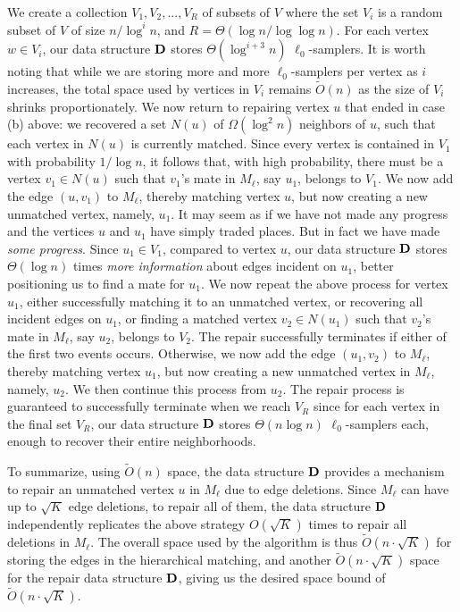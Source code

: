 \documentclass[11pt,a4paper]{article}
\newcommand{\D}{\mathsf{\bf D}}
\begin{document}
We create a collection $V_1, V_2, ..., V_R$ of subsets of $V$ where the set $V_i$ is a random subset of $V$ of size $n/\log^i n$, and $R = \Theta(\log n / \log \log n)$. For each vertex $w \in V_i$, our data structure $\D$ stores $\Theta(\log^{i+3} n)$ 
$\ell_0$-samplers. It is worth noting that while we are storing more and more $\ell_0$-samplers per vertex as $i$ increases, the total space used by vertices in $V_i$ remains $\tilde{O}(n)$ as the size of $V_i$ shrinks proportionately. 
We now return to repairing vertex $u$ that ended in case (b) above: we recovered a set $N(u)$ of $\Omega(\log^2 n)$ neighbors of $u$, such that each vertex in $N(u)$ is currently matched. Since every vertex is contained in $V_1$ with probability $1/\log n$, it follows that, with high probability, there must be a vertex $v_1 \in N(u)$ such that $v_1$'s mate in $M_{\ell}$, say $u_1$, belongs to $V_1$. We now add the edge $(u,v_1)$ to $M_{\ell}$, thereby matching vertex $u$, but now creating a new unmatched vertex, namely, $u_1$. It may seem as if we have not made any progress and the vertices $u$ and $u_1$ have simply traded places. But in fact we have made {\em some progress}. Since $u_1 \in V_1$, compared to vertex $u$, our data structure $\D$ stores $\Theta(\log n)$ times {\em more information} about edges incident on $u_1$, better positioning us to find a mate for $u_1$. We now repeat the above process for vertex $u_1$, either successfully matching it to an unmatched vertex, or recovering all incident edges on $u_1$, or finding a matched vertex $v_2 \in N(u_1)$ such that $v_2$'s mate in $M_{\ell }$, say $u_2$, belongs to $V_2$. The repair successfully terminates if either of the first two events occurs. Otherwise, we now add the edge $(u_1,v_2)$ to $M_{\ell}$, thereby matching vertex $u_1$, but now creating a new unmatched vertex in $M_{\ell }$, namely, $u_2$. We then continue this process from $u_2$. The repair process is guaranteed to successfully terminate when we reach $V_R$ since for each vertex in the final set $V_R$, our data structure $\D$ stores $\Theta(n \log n)$ $\ell_0$-samplers each, enough to recover their entire neighborhoods. 

To summarize, using $\tilde{O}(n)$ space, the data structure $\D$ provides a mechanism to repair an unmatched vertex $u$ in $M_{\ell}$ due to edge deletions. Since $M_{\ell}$ can have up to $\sqrt{K}$ edge deletions, to repair all of them, the data structure $\D$ independently replicates the above strategy $O(\sqrt{K})$ times to repair all deletions in $M_{\ell }$. The overall space used by the algorithm is thus $\tilde{O}(n \cdot \sqrt{K})$ for storing the edges in the hierarchical matching, and another $\tilde{O}(n \cdot  \sqrt{K})$ space for the repair data structure $\D$, giving us the desired space bound of $\tilde{O}(n \cdot \sqrt{K})$.
\end{document}
